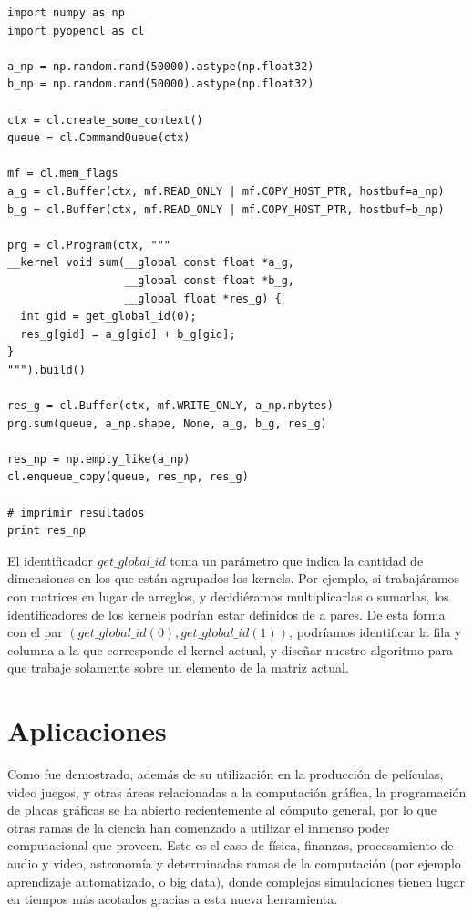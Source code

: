 \begin{verbatim}
import numpy as np
import pyopencl as cl

a_np = np.random.rand(50000).astype(np.float32)
b_np = np.random.rand(50000).astype(np.float32)

ctx = cl.create_some_context()
queue = cl.CommandQueue(ctx)

mf = cl.mem_flags
a_g = cl.Buffer(ctx, mf.READ_ONLY | mf.COPY_HOST_PTR, hostbuf=a_np)
b_g = cl.Buffer(ctx, mf.READ_ONLY | mf.COPY_HOST_PTR, hostbuf=b_np)

prg = cl.Program(ctx, """
__kernel void sum(__global const float *a_g,
                  __global const float *b_g,
                  __global float *res_g) {
  int gid = get_global_id(0);
  res_g[gid] = a_g[gid] + b_g[gid];
}
""").build()

res_g = cl.Buffer(ctx, mf.WRITE_ONLY, a_np.nbytes)
prg.sum(queue, a_np.shape, None, a_g, b_g, res_g)

res_np = np.empty_like(a_np)
cl.enqueue_copy(queue, res_np, res_g)

# imprimir resultados
print res_np
\end{verbatim}

El identificador $get\_global\_id$ toma un parámetro que indica la cantidad de dimensiones en los que están agrupados los kernels.
Por ejemplo, si trabajáramos con matrices en lugar de arreglos, y decidiéramos multiplicarlas o sumarlas, los identificadores de los kernels podrían estar definidos de a pares.
De esta forma con el par $(get\_global\_id(0), get\_global\_id(1))$, podríamos identificar la fila y columna a la que corresponde el kernel actual, y diseñar nuestro algoritmo para que trabaje solamente sobre un elemento de la matriz actual.


\section{Aplicaciones}
Como fue demostrado, además de su utilización en la producción de películas, video juegos, y otras áreas relacionadas a la computación gráfica, la programación de placas gráficas se ha abierto recientemente al cómputo general, por lo que otras ramas de la ciencia han comenzado a utilizar el inmenso poder computacional que proveen.
Este es el caso de física, finanzas, procesamiento de audio y video, astronomía y determinadas ramas de la computación (por ejemplo aprendizaje automatizado, o big data), donde complejas simulaciones tienen lugar en tiempos más acotados gracias a esta nueva herramienta.

